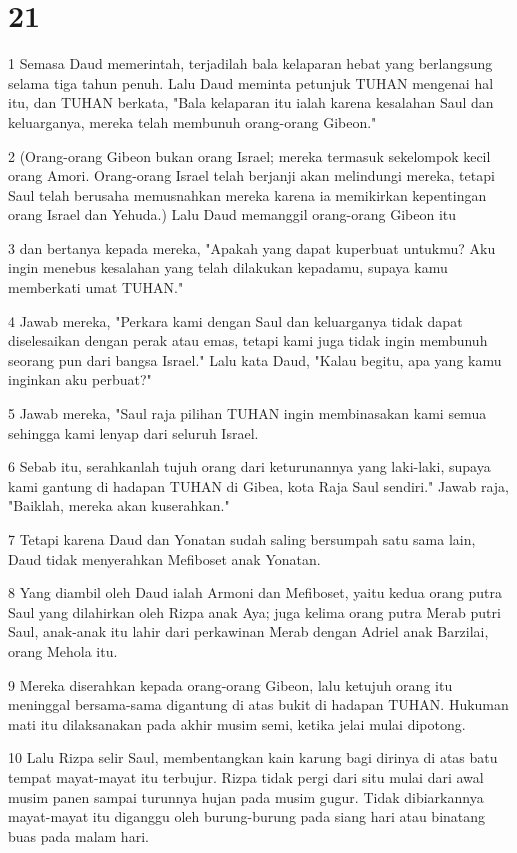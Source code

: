\chapter{21}

\par 1 Semasa Daud memerintah, terjadilah bala kelaparan hebat yang berlangsung selama tiga tahun penuh. Lalu Daud meminta petunjuk TUHAN mengenai hal itu, dan TUHAN berkata, "Bala kelaparan itu ialah karena kesalahan Saul dan keluarganya, mereka telah membunuh orang-orang Gibeon."
\par 2 (Orang-orang Gibeon bukan orang Israel; mereka termasuk sekelompok kecil orang Amori. Orang-orang Israel telah berjanji akan melindungi mereka, tetapi Saul telah berusaha memusnahkan mereka karena ia memikirkan kepentingan orang Israel dan Yehuda.) Lalu Daud memanggil orang-orang Gibeon itu
\par 3 dan bertanya kepada mereka, "Apakah yang dapat kuperbuat untukmu? Aku ingin menebus kesalahan yang telah dilakukan kepadamu, supaya kamu memberkati umat TUHAN."
\par 4 Jawab mereka, "Perkara kami dengan Saul dan keluarganya tidak dapat diselesaikan dengan perak atau emas, tetapi kami juga tidak ingin membunuh seorang pun dari bangsa Israel." Lalu kata Daud, "Kalau begitu, apa yang kamu inginkan aku perbuat?"
\par 5 Jawab mereka, "Saul raja pilihan TUHAN ingin membinasakan kami semua sehingga kami lenyap dari seluruh Israel.
\par 6 Sebab itu, serahkanlah tujuh orang dari keturunannya yang laki-laki, supaya kami gantung di hadapan TUHAN di Gibea, kota Raja Saul sendiri." Jawab raja, "Baiklah, mereka akan kuserahkan."
\par 7 Tetapi karena Daud dan Yonatan sudah saling bersumpah satu sama lain, Daud tidak menyerahkan Mefiboset anak Yonatan.
\par 8 Yang diambil oleh Daud ialah Armoni dan Mefiboset, yaitu kedua orang putra Saul yang dilahirkan oleh Rizpa anak Aya; juga kelima orang putra Merab putri Saul, anak-anak itu lahir dari perkawinan Merab dengan Adriel anak Barzilai, orang Mehola itu.
\par 9 Mereka diserahkan kepada orang-orang Gibeon, lalu ketujuh orang itu meninggal bersama-sama digantung di atas bukit di hadapan TUHAN. Hukuman mati itu dilaksanakan pada akhir musim semi, ketika jelai mulai dipotong.
\par 10 Lalu Rizpa selir Saul, membentangkan kain karung bagi dirinya di atas batu tempat mayat-mayat itu terbujur. Rizpa tidak pergi dari situ mulai dari awal musim panen sampai turunnya hujan pada musim gugur. Tidak dibiarkannya mayat-mayat itu diganggu oleh burung-burung pada siang hari atau binatang buas pada malam hari.
